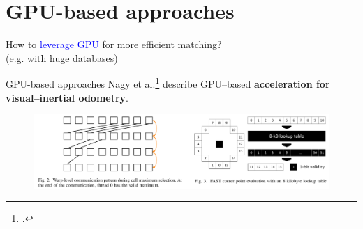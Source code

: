 \documentclass[aspectratio=169]{beamer}
\begin{document}
\section{GPU-based approaches}
\begin{frame}

\centering \Large How to \textcolor{blue}{leverage GPU} for more efficient matching?\\
(e.g. with huge databases)
\end{frame}


\begin{frame}{GPU-based approaches}
Nagy et al.\footcite{GPU_VIO} describe GPU--based \textbf{acceleration for visual--inertial odometry}.\\
\begin{itemize}
\end{itemize}
\begin{figure}
	\centering
	\includegraphics[width=15.0cm]{SemCSE_vio}
\end{figure}
\end{frame}
\end{document}
